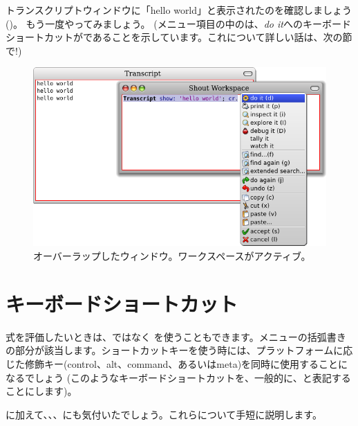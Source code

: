\documentclass[a4paper,10pt,twoside]{book}
\begin{document}
トランスクリプトウィンドウに「hello world」と表示されたのを確認しましょう
()。
もう一度やってみましょう。
(メニュー項目の中のは、\emph{do it}へのキーボードショートカットがであることを示しています。これについて詳しい話は、次の節で!)

\begin{figure}[htb]
\centerline {\includegraphics[width=\textwidth]{HelloWorld}}
\caption{オーバーラップしたウィンドウ。ワークスペースがアクティブ。}
\end{figure}

\section{キーボードショートカット}

式を評価したいときは、\actclick ではなく を使うこともできます。メニューの括弧書きの部分が該当します。ショートカットキーを使う時には、プラットフォームに応じた修飾キー(control、alt、command、あるいはmeta)を同時に使用することになるでしょう
(このようなキーボードショートカットを、一般的に、と表記することにします)。


に加えて、、、にも気付いたでしょう。これらについて手短に説明します。

\end{document}
